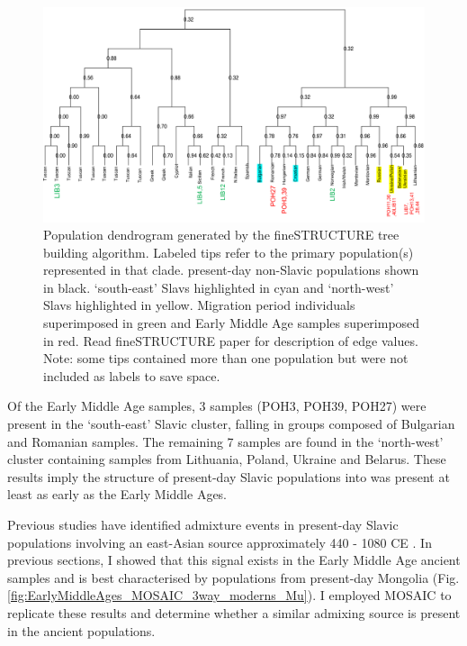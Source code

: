 \begin{figure}[htp]
    \centering
    \includegraphics[width=1.0\textwidth]{../images/chapter5/tree_with_ancients.pdf}
    \caption{Population dendrogram generated by the fineSTRUCTURE tree building algorithm. Labeled tips refer to the primary population(s) represented in that clade. present-day non-Slavic populations shown in black. `south-east' Slavs highlighted in cyan and `north-west' Slavs highlighted in yellow. Migration period individuals superimposed in green and Early Middle Age samples superimposed in red. Read fineSTRUCTURE paper for description of edge values. Note: some tips contained more than one population but were not included as labels to save space.}
    \label{fig:tree_with_ancients}
\end{figure} 

Of the Early Middle Age samples, 3 samples (POH3, POH39, POH27) were present in the `south-east' Slavic cluster, falling in groups composed of Bulgarian and Romanian samples. The remaining 7 samples are found in the `north-west' cluster containing samples from Lithuania, Poland, Ukraine and Belarus. These results imply the structure of present-day Slavic populations into was present at least as early as the Early Middle Ages. 

Previous studies have identified admixture events in present-day Slavic populations involving an east-Asian source approximately 440 - 1080 CE \cite{Hellenthal2016, MOSAIC_2019}. In previous sections, I showed that this signal exists in the Early Middle Age ancient samples and is best characterised by populations from present-day Mongolia (Fig. \ref{fig:EarlyMiddleAges_MOSAIC_3way_moderns_Mu}). I employed MOSAIC \cite{MOSAIC_2019} to replicate these results and determine whether a similar admixing source is present in the ancient populations. 

